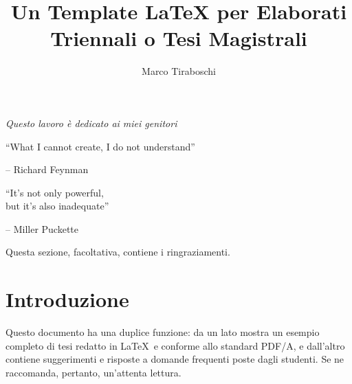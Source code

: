\documentclass[12pt]{report}
\title{Un Template \LaTeX{} per Elaborati\\Triennali o Tesi Magistrali}
\author{Marco Tiraboschi}
\begin{document}
\makefrontpage
\beforepreface

% 
%

{\raggedleft \large \sl Questo lavoro \`{e} dedicato ai miei genitori\\
	
	\vspace{2cm}
	
	``What I cannot create, I do not understand''
	
	\bigskip
	
	\--- Richard Feynman\\
  
	\vspace{2cm}
	
	``It's not only powerful,\\but it's also inadequate''
	
	\bigskip
	
	\--- Miller Puckette\\}
         
% 
%


%
%

Questa sezione, facoltativa, contiene i ringraziamenti.

%
%

\afterpreface

% 
% 

\chapter{Introduzione}
\label{cap:introduzione}

Questo documento ha una duplice funzione: da un lato mostra un esempio completo di tesi redatto in \LaTeX\ e conforme allo standard PDF/A, e dall'altro contiene suggerimenti e risposte a domande frequenti poste dagli studenti. Se ne raccomanda, pertanto, un'attenta lettura.
\end{document}
